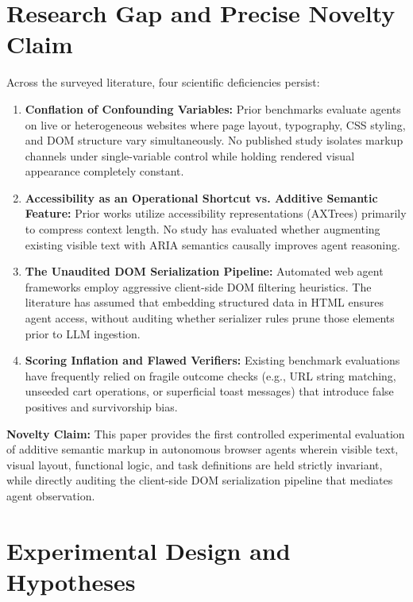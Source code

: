 \documentclass[11pt,a4paper]{article}
\begin{document}
\section{Research Gap and Precise Novelty Claim}
\label{sec:gap}

Across the surveyed literature, four scientific deficiencies persist:
\begin{enumerate}
    \item \textbf{Conflation of Confounding Variables:} Prior benchmarks evaluate agents on live or heterogeneous websites where page layout, typography, CSS styling, and DOM structure vary simultaneously. No published study isolates markup channels under single-variable control while holding rendered visual appearance completely constant.
    \item \textbf{Accessibility as an Operational Shortcut vs. Additive Semantic Feature:} Prior works utilize accessibility representations (AXTrees) primarily to compress context length. No study has evaluated whether augmenting existing visible text with ARIA semantics causally improves agent reasoning.
    \item \textbf{The Unaudited DOM Serialization Pipeline:} Automated web agent frameworks employ aggressive client-side DOM filtering heuristics. The literature has assumed that embedding structured data in HTML ensures agent access, without auditing whether serializer rules prune those elements prior to LLM ingestion.
    \item \textbf{Scoring Inflation and Flawed Verifiers:} Existing benchmark evaluations have frequently relied on fragile outcome checks (e.g., URL string matching, unseeded cart operations, or superficial toast messages) that introduce false positives and survivorship bias.
\end{enumerate}

\textbf{Novelty Claim:} This paper provides the first controlled experimental evaluation of additive semantic markup in autonomous browser agents wherein visible text, visual layout, functional logic, and task definitions are held strictly invariant, while directly auditing the client-side DOM serialization pipeline that mediates agent observation.

\section{Experimental Design and Hypotheses}
\label{sec:design}
\end{document}
